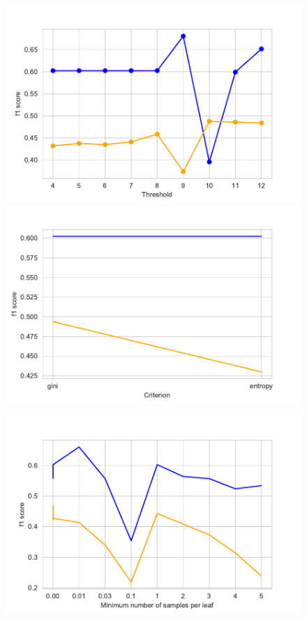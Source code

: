 \documentclass[11pt]{article}
\begin{document}
%
\begin{figure}[h]
\begin{minipage}[l]{0.33\textwidth}
\includegraphics[width=1\linewidth]{bridges/thresholds_rdf.pdf}
\end{minipage}
\begin{minipage}[l]{0.33\textwidth}
\includegraphics[width=1\linewidth]{bridges/criterion_rdf.pdf}
\end{minipage}
\begin{minipage}[l]{0.33\textwidth}
\includegraphics[width=1\linewidth]{bridges/min_samples_leaf_rdf.pdf}\\

\end{minipage}
\end{figure}
\end{document}

